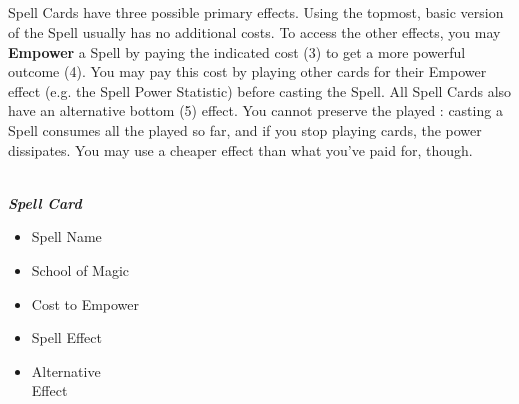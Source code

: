 \begin{multicols*}{2}
\vspace*{\fill}
{}

\subsection*{}

Spell Cards have three possible primary effects.
Using the topmost, basic version of the Spell usually has no additional costs.
To access the other effects, you may \textbf{Empower} a Spell by paying the indicated cost (3) to get a more powerful outcome (4).
You may pay this cost by playing other cards for their Empower  effect (e.g. the Spell Power Statistic) before casting the Spell.
All Spell Cards also have an alternative bottom (5)  effect.
You cannot preserve the played : casting a Spell consumes all the  played so far, and if you stop playing cards, the power dissipates.
You may use a cheaper  effect than what you've paid for, though.\par

{
  \centering
  \\
  \medskip
  \footnotesize
  \textbf{\textit{\textcolor{darkcandyapplered}{Spell Card}}}\par

  \noindent
  \begin{minipage}[t]{0.5\linewidth}
    \begin{itemize}[itemsep=0pt, parsep=5pt, topsep=0pt, partopsep=0pt]
      \item[\textbf{1.}] Spell Name
      \item[\textbf{2.}] School of Magic
      \item[\textbf{3.}] Cost to Empower
    \end{itemize}
  \end{minipage}
  \begin{minipage}[t]{0.4\linewidth}
    \begin{itemize}[itemsep=0pt, parsep=5pt, topsep=0pt, partopsep=0pt]
      \item[\textbf{4.}] Spell Effect
      \item[\textbf{5.}] Alternative\\Effect
    \end{itemize}
  \end{minipage}
}
\medskip


\end{multicols*}
